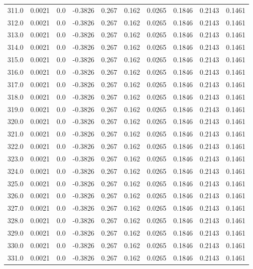 \begin{longtable}{lrrrrrrrrr}
311.0 & 0.0021 & 0.0 & -0.3826 & 0.267 & 0.162 & 0.0265 & 0.1846 & 0.2143 & 0.1461 \\
312.0 & 0.0021 & 0.0 & -0.3826 & 0.267 & 0.162 & 0.0265 & 0.1846 & 0.2143 & 0.1461 \\
313.0 & 0.0021 & 0.0 & -0.3826 & 0.267 & 0.162 & 0.0265 & 0.1846 & 0.2143 & 0.1461 \\
314.0 & 0.0021 & 0.0 & -0.3826 & 0.267 & 0.162 & 0.0265 & 0.1846 & 0.2143 & 0.1461 \\
315.0 & 0.0021 & 0.0 & -0.3826 & 0.267 & 0.162 & 0.0265 & 0.1846 & 0.2143 & 0.1461 \\
316.0 & 0.0021 & 0.0 & -0.3826 & 0.267 & 0.162 & 0.0265 & 0.1846 & 0.2143 & 0.1461 \\
317.0 & 0.0021 & 0.0 & -0.3826 & 0.267 & 0.162 & 0.0265 & 0.1846 & 0.2143 & 0.1461 \\
318.0 & 0.0021 & 0.0 & -0.3826 & 0.267 & 0.162 & 0.0265 & 0.1846 & 0.2143 & 0.1461 \\
319.0 & 0.0021 & 0.0 & -0.3826 & 0.267 & 0.162 & 0.0265 & 0.1846 & 0.2143 & 0.1461 \\
320.0 & 0.0021 & 0.0 & -0.3826 & 0.267 & 0.162 & 0.0265 & 0.1846 & 0.2143 & 0.1461 \\
321.0 & 0.0021 & 0.0 & -0.3826 & 0.267 & 0.162 & 0.0265 & 0.1846 & 0.2143 & 0.1461 \\
322.0 & 0.0021 & 0.0 & -0.3826 & 0.267 & 0.162 & 0.0265 & 0.1846 & 0.2143 & 0.1461 \\
323.0 & 0.0021 & 0.0 & -0.3826 & 0.267 & 0.162 & 0.0265 & 0.1846 & 0.2143 & 0.1461 \\
324.0 & 0.0021 & 0.0 & -0.3826 & 0.267 & 0.162 & 0.0265 & 0.1846 & 0.2143 & 0.1461 \\
325.0 & 0.0021 & 0.0 & -0.3826 & 0.267 & 0.162 & 0.0265 & 0.1846 & 0.2143 & 0.1461 \\
326.0 & 0.0021 & 0.0 & -0.3826 & 0.267 & 0.162 & 0.0265 & 0.1846 & 0.2143 & 0.1461 \\
327.0 & 0.0021 & 0.0 & -0.3826 & 0.267 & 0.162 & 0.0265 & 0.1846 & 0.2143 & 0.1461 \\
328.0 & 0.0021 & 0.0 & -0.3826 & 0.267 & 0.162 & 0.0265 & 0.1846 & 0.2143 & 0.1461 \\
329.0 & 0.0021 & 0.0 & -0.3826 & 0.267 & 0.162 & 0.0265 & 0.1846 & 0.2143 & 0.1461 \\
330.0 & 0.0021 & 0.0 & -0.3826 & 0.267 & 0.162 & 0.0265 & 0.1846 & 0.2143 & 0.1461 \\
331.0 & 0.0021 & 0.0 & -0.3826 & 0.267 & 0.162 & 0.0265 & 0.1846 & 0.2143 & 0.1461 \\

\end{longtable}
